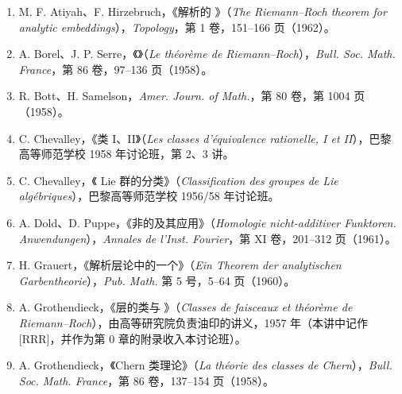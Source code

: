 \begin{enumerate}
\item[{[1]}] M. F. Atiyah、F. Hirzebruch，《解析的 》（\textit{The Riemann--Roch theorem for analytic embeddings}），\textit{Topology}，第 1 卷，151--166 页（1962）。
\item[{[2]}] A. Borel、J. P. Serre，《》（\textit{Le théorème de Riemann--Roch}），\textit{Bull. Soc. Math. France}，第 86 卷，97--136 页（1958）。
\item[{[3]}] R. Bott、H. Samelson，\textit{Amer. Journ. of Math.}，第 80 卷，第 1004 页（1958）。
\item[{[4]}] C. Chevalley，《类 I、II》（\textit{Les classes d'équivalence rationelle, I et II}），巴黎高等师范学校 1958 年讨论班，第 2、3 讲。
\item[{[5]}] C. Chevalley，《 Lie 群的分类》（\textit{Classification des groupes de Lie algébriques}），巴黎高等师范学校 1956/58 年讨论班。
\item[{[6]}] A. Dold、D. Puppe，《非的及其应用》（\textit{Homologie nicht-additiver Funktoren. Anwendungen}），\textit{Annales de l'Inst. Fourier}，第 XI 卷，201--312 页（1961）。
\item[{[7]}] H. Grauert，《解析层论中的一个》（\textit{Ein Theorem der analytischen Garbentheorie}），\textit{Pub. Math.} 第 5 号，5--64 页（1960）。
\item[{[8]}] A. Grothendieck，《层的类与 》（\textit{Classes de faisceaux et théorème de Riemann--Roch}），由高等研究院负责油印的讲义，1957 年（本讲中记作 [RRR]，并作为第 0 章的附录收入本讨论班）。
\item[{[9]}] A. Grothendieck，《Chern 类理论》（\textit{La théorie des classes de Chern}），\textit{Bull. Soc. Math. France}，第 86 卷，137--154 页（1958）。
\end{enumerate}
